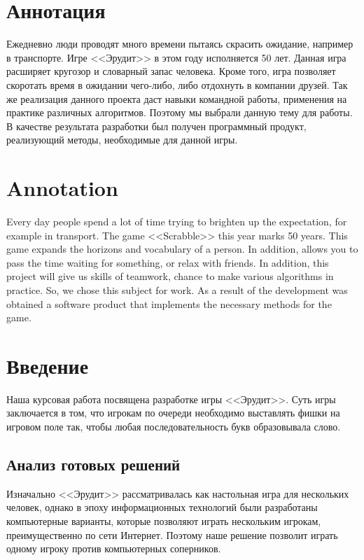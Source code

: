 \documentclass[a4paper,14pt]{article}
\begin{document}

\tableofcontents
\pagebreak
\section{Аннотация}
	Ежедневно люди проводят много времени пытаясь скрасить ожидание, например в транспорте.
	Игре <<Эрудит>> в этом году исполняется 50 лет.
	Данная игра расширяет кругозор и словарный запас человека.
	Кроме того, игра позволяет скоротать время в ожидании чего-либо, либо отдохнуть в компании друзей.
	Так же реализация данного проекта даст навыки командной работы, применения на практике различных алгоритмов.
	Поэтому мы выбрали данную тему для работы. В качестве результата разработки был получен программный продукт, реализующий методы, необходимые для данной игры.

\section*{Annotation}
Every day people spend a lot of time trying to brighten up the expectation, for example in transport.
The game <<Scrabble>> this year marks 50 years.
This game expands the horizons and vocabulary of a person.
In addition, allows you to pass the time waiting for something, or relax with friends.
In addition, this project will give us skills of teamwork, chance to make various algorithms in practice.
So, we chose this subject for work. As a result of the development was obtained a software product that implements the necessary methods for the game.

\pagebreak

\section{Введение}
	Наша курсовая работа посвящена разработке игры <<Эрудит>>.
	Суть игры заключается в том, что игрокам по очереди необходимо выставлять фишки на игровом поле так, чтобы любая последовательность букв образовывала слово.
	
	\subsection{Анализ готовых решений}
	Изначально <<Эрудит>> рассматривалась как настольная игра для нескольких человек, однако в эпоху информационных технологий были разработаны компьютерные варианты, которые позволяют играть нескольким игрокам, преимущественно по сети Интернет.
	Поэтому наше решение позволит играть одному игроку против компьютерных соперников.
	
\end{document}
